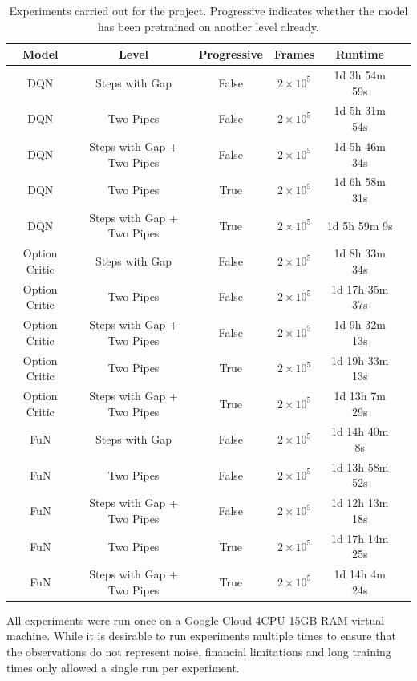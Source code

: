\documentclass[notitlepage,a4paper,11pt]{article}
\begin{document}
\begin{table}[h!]
\centering
\begin{tabular}{ |c|c|c|c|c|c| } 
 \hline
 \textbf{Model} & \textbf{Level} & \textbf{Progressive} & \textbf{Frames} & \textbf{Runtime}\\
 \hline 
 DQN & Steps with Gap & False & $2 \times 10^5$ & 1d 3h 54m 59s\\ 
 \hline
 DQN & Two Pipes & False & $2 \times 10^5$ & 1d 5h 31m 54s\\ 
 \hline
 DQN & Steps with Gap + Two Pipes & False & $2 \times 10^5$ & 1d 5h 46m 34s \\ 
 \hline
DQN & Two Pipes & True & $2 \times 10^5$ & 1d 6h 58m 31s\\ 
 \hline
 DQN & Steps with Gap + Two Pipes & True & $2 \times 10^5$ & 1d 5h 59m 9s\\ 
 \hline 
 Option Critic & Steps with Gap & False & $2 \times 10^5$ & 1d 8h 33m 34s\\ 
 \hline
 Option Critic & Two Pipes & False & $2 \times 10^5$ & 1d 17h 35m 37s\\ 
 \hline
 Option Critic & Steps with Gap + Two Pipes & False & $2 \times 10^5$ & 1d 9h 32m 13s\\ 
 \hline
Option Critic & Two Pipes & True & $2 \times 10^5$ & 1d 19h 33m 13s\\ 
 \hline
 Option Critic & Steps with Gap + Two Pipes & True & $2 \times 10^5$ & 1d 13h 7m 29s\\ 
 \hline
 
  FuN & Steps with Gap & False & $2 \times 10^5$ & 1d 14h 40m 8s\\ 
 \hline
 FuN & Two Pipes & False & $2 \times 10^5$ & 1d 13h 58m 52s\\ 
 \hline
 FuN & Steps with Gap + Two Pipes & False & $2 \times 10^5$ & 1d 12h 13m 18s\\ 
 \hline
FuN & Two Pipes & True & $2 \times 10^5$ & 1d 17h 14m 25s\\ 
 \hline
 FuN & Steps with Gap + Two Pipes & True & $2 \times 10^5$ & 1d 14h 4m 24s\\ 
 \hline
 
\end{tabular}
\caption{Experiments carried out for the project. Progressive indicates whether the model has been pretrained on another level already.}
\end{table}

All experiments were run once on a Google Cloud 4CPU 15GB RAM virtual machine. While it is desirable to run experiments multiple times to ensure that the observations do not represent noise, financial limitations and long training times only allowed a single run per experiment. 
\end{document}
